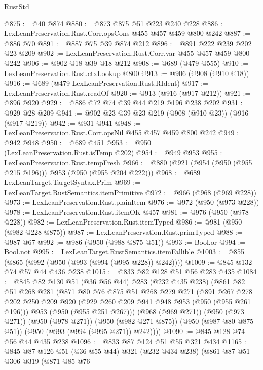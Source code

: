 \begin{lexlean}{RustStd}
\begin{coremodule}
@875 := @40 @874
@880 := @873 @875 @51 @223 @240 @228
@886 := LexLeanPreservation.Rust.Corr.opsCons @455 @457 @459 @800 @242
@887 := @886 @70
@891 := @887 @75 @39 @874 @212
@896 := @891 @222 @239 @202 @23 @209
@902 := LexLeanPreservation.Rust.Corr.var @455 @457 @459 @800 @242
@906 := @902 @18 @39 @18 @212
@908 := @689 (@479 @555)
@910 := LexLeanPreservation.Rust.ctxLookup @800
@913 := @906 (@908 (@910 @18))
@916 := @689 (@479 LexLeanPreservation.Rust.RIdent)
@917 := LexLeanPreservation.Rust.readOf
@920 := @913 (@916 (@917 @212))
@921 := @896 @920
@929 := @886 @72 @74 @39 @44 @219 @196 @238 @202
@931 := @929 @28 @209
@941 := @902 @23 @39 @23 @219 (@908 (@910 @23)) (@916 (@917 @219))
@942 := @931 @941
@948 := LexLeanPreservation.Rust.Corr.opsNil @455 @457 @459 @800 @242
@949 := @942 @948
@950 := @689 @451
@953 := @950 (LexLeanPreservation.Rust.isTemp @202)
@954 := @949 @953
@955 := LexLeanPreservation.Rust.tempFresh
@966 := @880 (@921 (@954 (@950 (@955 @215 @196))) @953 (@950 (@955 @204 @222)))
@968 := @689 LexLeanTarget.TargetSyntax.Prim
@969 := LexLeanTarget.RustSemantics.itemPrimitive
@972 := @966 (@968 (@969 @228))
@973 := LexLeanPreservation.Rust.plainItem
@976 := @972 (@950 (@973 @228))
@978 := LexLeanPreservation.Rust.itemOK @457
@981 := @976 (@950 (@978 @228))
@982 := LexLeanPreservation.Rust.itemTyped
@986 := @981 (@950 (@982 @228 @875))
@987 := LexLeanPreservation.Rust.primTyped
@988 := @987 @67
@992 := @986 (@950 (@988 @875 @51))
@993 := Bool.or
@994 := Bool.not
@995 := LexLeanTarget.RustSemantics.itemFallible
@1003 := @855 (@865 (@992 (@950 (@993 (@994 (@995 @228)) @242))))
@1009 := @845 @132 @74 @57 @44 @436 @238
@1015 := @833 @82 @128 @51 @56 @283 @435
@1084 := @845
    @82
    @130
    @51
    (@36 @56 @44)
    @283
    (@232 @435 @238)
    (@861
      @82
      @51
      @268
      @281
      (@871
        @80
        @76
        @875
        @51
        @268
        @279
        @271
        (@891
          @267
          @278
          @202
          @250
          @209
          @920
          (@929 @260 @209 @941 @948 @953 (@950 (@955 @261 @196)))
          @953
          (@950 (@955 @251 @267)))
        (@968 (@969 @271))
        (@950 (@973 @271))
        (@950 (@978 @271))
        (@950 (@982 @271 @875))
        (@950 (@987 @80 @875 @51))
        (@950 (@993 (@994 (@995 @271)) @242))))
@1090 := @845 @128 @74 @56 @44 @435 @238
@1096 := @833 @87 @124 @51 @55 @321 @434
@1165 := @845
    @87
    @126
    @51
    (@36 @55 @44)
    @321
    (@232 @434 @238)
    (@861
      @87
      @51
      @306
      @319
      (@871
        @85
        @76

\end{coremodule}
\end{lexlean}
